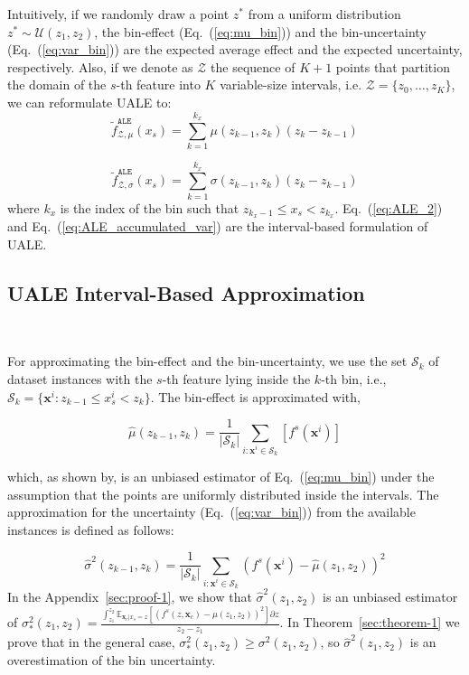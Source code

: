 \documentclass[twoside]{article}
\newcommand{\dfdx}{f^s}
\newcommand{\xc}{\mathbf{x}_c}
\begin{document}
%
Intuitively, if we randomly draw a point \(z^*\) from a uniform
distribution \(z^* \sim \mathcal{U}(z_1, z_2)\), the bin-effect
(Eq.~(\ref{eq:mu_bin})) and the bin-uncertainty
(Eq.~(\ref{eq:var_bin})) are the expected average effect and the
expected uncertainty, respectively. Also, if we denote as
\(\mathcal{Z}\) the sequence of \(K+1\) points that partition the
domain of the \(s\)-th feature into \(K\) variable-size intervals,
i.e.  \(\mathcal{Z} = \{z_0, \ldots, z_K\}\), we can reformulate UALE
to:
\begin{equation}
  \label{eq:ALE_2}
  \tilde{f}^{\mathtt{ALE}}_{\mathcal{Z}, \mu}(x_s) = \sum_{k=1}^{k_x} \mu(z_{k-1}, z_k) (z_k - z_{k-1})
\end{equation}

\begin{equation}
  \label{eq:ALE_accumulated_var}
  \tilde{f}^{\mathtt{ALE}}_{\mathcal{Z}, \sigma}(x_s) =  \sum_{k=1}^{k_x} \sigma(z_{k-1}, z_k) (z_k - z_{k-1})
\end{equation}
%
where \(k_x\) is the index of the bin such that
\( z_{k_x - 1} \leq x_s < z_{k_x}\). Eq.~(\ref{eq:ALE_2}) and
Eq.~(\ref{eq:ALE_accumulated_var}) are the interval-based formulation
of UALE.

\subsection{UALE Interval-Based Approximation}
~\label{sec:UALE-approximation}

For approximating the bin-effect and the bin-uncertainty, we use the
set \(\mathcal{S}_k\) of dataset instances with the \(s\)-th feature
lying inside the \(k\)-th bin, i.e.,
\( \mathcal{S}_k= \{ \mathbf{x}^i : z_{k-1} \leq x^i_s < z_k \}
\). The bin-effect is approximated with,

\begin{equation}
  \label{eq:mu_bin_approx}
  \hat{\mu}(z_{k-1}, z_k) = \frac{1}{|\mathcal{S}_k|}
  \sum_{i:\mathbf{x}^i \in \mathcal{S}_k} \left [ \dfdx(\mathbf{x}^i)
  \right ]
\end{equation}

%
which, as shown by\citep{gkolemis22}, is an unbiased estimator of
Eq.~(\ref{eq:mu_bin}) under the assumption that the points are
uniformly distributed inside the intervals. The approximation for the
uncertainty (Eq.~(\ref{eq:var_bin})) from the available instances is
defined as follows:

%
\begin{equation}
  \label{eq:var_bin_approx}
  \hat{\sigma}^2(z_{k-1}, z_k) = \frac{1}{|\mathcal{S}_k|}
\sum_{i:\mathbf{x}^i \in \mathcal{S}_k} \left ( \dfdx(\mathbf{x}^i) -
  \hat{\mu}(z_1, z_2) \right )^2
\end{equation}
%
In the Appendix~\ref{sec:proof-1}, we show that
\(\hat{\sigma}^2(z_1, z_2)\) is an unbiased estimator of
\(\sigma^2_*(z_1, z_2) = \frac{\int_{z_1}^{z_2} \mathbb{E}_{\xc|x_s=z}
  \left [ (f^s(z, \xc) - \mu(z_1, z_2) )^2 \right] \partial z}{z_2 -
  z_1} \). In Theorem~\ref{sec:theorem-1} we prove that in the general
case, \(\sigma_*^2(z_1, z_2) \geq \sigma^2(z_1, z_2)\), so
\(\hat{\sigma}^2(z_1, z_2)\) is an overestimation of the bin
uncertainty.
\end{document}
